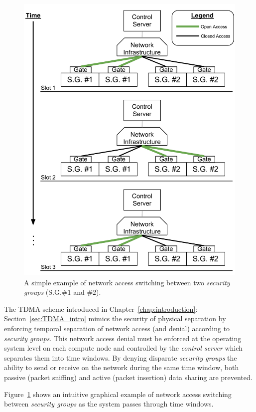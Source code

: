 \documentclass[oneside,12pt]{memoir}
\begin{document}
\begin{figure}
\centering
\includegraphics[scale=0.55]{network_access_switching.pdf}
\caption{A simple example of network access switching between two \textit{security groups} (S.G.$\#1$ and $\#2$).}
\label{fig:network_access_switching}
\end{figure}

The TDMA scheme introduced in Chapter~\ref{chap:introduction}: Section~\ref{sec:TDMA_intro} mimics the security of physical separation by enforcing temporal separation of network access (and denial) according to \textit{security groups}. This network access denial must be enforced at the operating system level on each compute node and controlled by the \textit{control server} which separates them into time windows. By denying disparate \textit{security groups} the ability to send or receive on the network during the same time window, both passive (packet sniffing) and active (packet insertion) data sharing are prevented.

Figure~\ref{fig:network_access_switching} shows an intuitive graphical example of network access switching between \textit{security groups} as the system passes through time windows.
\end{document}
